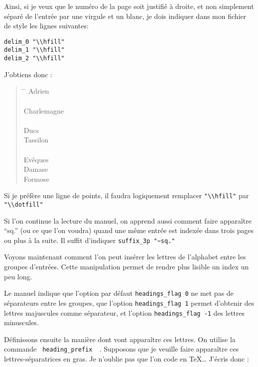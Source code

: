 Ainsi, si je veux que le numéro de la page soit justifié à droite, et non simplement séparé de l'entrée par une virgule et un blanc, je dois indiquer dans mon fichier de style les lignes suivantes:

\begin{verbatim}
delim_0 "\\hfill"
delim_1 "\\hfill"
delim_2 "\\hfill"
\end{verbatim}

J'obtiens donc : 

\begin{quotation}
\begin{tabbing}
\hspace{0,5cm}  \=  \hspace{3cm} \= \kill
Adrien\> \\
\\
Charlemagne \> \\
\\
Ducs \\
\> Tassilon\\
\\
Evêques \\
\> Damase \\
\> Formose\\
\end{tabbing}
\end{quotation}

Si je préfère une ligne de points, il faudra logiquement remplacer \verb|"\\hfill"| par \verb+"\\dotfill"+


Si l'on continue la lecture du manuel, on apprend aussi comment faire apparaître \enquote{sq.} (ou ce que l'on voudra) quand une même entrée est indexée dans trois pages ou plus à la suite. Il suffit d'indiquer \verb+suffix_3p "~sq."+

Voyons maintenant comment l'on peut insérer les lettres de l'alphabet entre les groupes d'entrées. Cette manipulation permet de rendre plus lisible un index un peu long. 

Le manuel indique que l'option par défaut \verb+headings_flag 0+ ne met pas de séparateurs entre les groupes, que l'option \verb+headings_flag 1+ permet d'obtenir des lettres majuscules comme séparateur, et l'option  \verb+headings_flag -1+ des lettres minuscules.

Définissons ensuite la manière dont vont apparaître ces lettres. On utilise la commande \verb| heading_prefix  |. Supposons que je veuille faire apparaître ces lettres-séparatrices en gras. Je n'oublie pas que l'on code en \TeX … J'écris donc :

